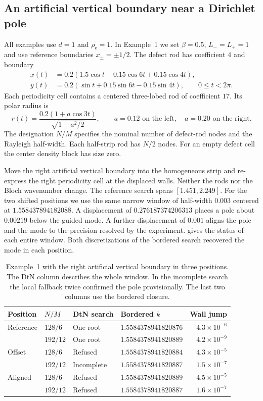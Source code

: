 \subsection{An artificial vertical boundary near a Dirichlet pole}\label{sec:exp-pole}
All examples use $d=1$ and $\rho_{\mathrm e}=1$. In Example~1 we set
$\beta=0.5$, $L_-=L_+=1$ and use reference boundaries $x_\pm=\pm 1/2$.
The defect rod has coefficient $4$ and boundary
\[
 \begin{aligned}
 x(t)&=0.2(1.5\cos t+0.15\cos 6t+0.15\cos 4t),\\
 y(t)&=0.2(\sin t+0.15\sin 6t-0.15\sin 4t),\qquad 0\le t<2\pi .
 \end{aligned}
\]
Each periodicity cell contains a centered three-lobed rod of coefficient
$17$. Its polar radius is
\[
 r(t)=\frac{0.2(1+a\cos 3t)}{\sqrt{1+a^2/2}},\qquad
 a=0.12\text{ on the left},\quad a=0.20\text{ on the right}.
\]
The designation $N/M$ specifies the nominal number of defect-rod nodes
and the Rayleigh half-width. Each half-strip rod has $N/2$ nodes. For
an empty defect cell the center density block has size zero.

Move the right artificial vertical boundary into the homogeneous strip
and re-express the right periodicity cell at the displaced walls. Neither
the rods nor the Bloch wavenumber change. The reference search spans
$[1.451,2.249]$. For the two shifted positions we use the same narrow
window of half-width $0.003$ centered at $1.558437894182088$.
A displacement of $0.276187374206313$ places a pole about $0.00219$
below the guided mode. A further displacement of $0.001$ aligns the pole
and the mode to the precision resolved by the experiment.
 gives the status of each entire window. Both
discretizations of the bordered search recovered the mode in each position.

\begin{table}[htbp]
\centering
\caption{Example~1 with the right artificial vertical boundary in three
positions. The DtN column describes the whole window. In the incomplete
search the local fallback twice confirmed the pole provisionally. The
last two columns use the bordered closure.}
\label{tab:pole-free}
\begin{tabular}{@{}ll l l r@{}}
\toprule
Position & $N/M$ & DtN search & Bordered $k$ & Wall jump\\
\midrule
Reference & $128/6$  & One root & $1.5584378941820876$ & $4.3\times10^{-6}$\\
          & $192/12$ & One root & $1.5584378941820889$ & $4.2\times10^{-9}$\\
Offset    & $128/6$  & Refused & $1.5584378941820884$ & $4.3\times10^{-5}$\\
          & $192/12$ & Incomplete & $1.5584378941820887$ & $1.5\times10^{-7}$\\
Aligned   & $128/6$  & Refused & $1.5584378941820889$ & $4.5\times10^{-5}$\\
          & $192/12$ & Refused & $1.5584378941820887$ & $1.6\times10^{-7}$\\
\bottomrule
\end{tabular}
\end{table}

